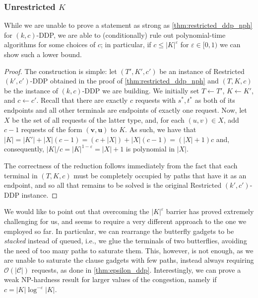 \documentclass[a4paper,UKenglish,cleveref, autoref, thm-restate]{lipics-v2021}
\renewcommand{\NP}{{\sf NP}\xspace}
\newcommand{\pname}[1]{{\sc #1}}
\newcommand{\bigO}[1]{\mathcal{O}\!\left(#1\right)}
\newcommand{\congestion}{c}
\begin{document}
  \subsubsection{Unrestricted $K$}

  While we are unable to prove a statement as strong as
  \autoref{thm:restricted_ddp_nph} for \pname{$(k,c)$-DDP}, we
  are able to (conditionally) rule out polynomial-time algorithms for some choices of $\congestion$;
  in particular, if $\congestion \leq |K|^\varepsilon$ for $\varepsilon \in [0,1)$ we can show
  such a lower bound.

  \epsilonddp*

  \begin{proof}
    The construction is simple: let $(T', K', \congestion')$ be an instance of \pname{Restricted $(k',c')$-DDP} obtained in the proof of
    \autoref{thm:restricted_ddp_nph} and $(T, K, \congestion)$ be the instance of
    \pname{$(k,c)$-DDP} we are building.
    We initially set $T \gets T'$, $K \gets K'$, and $\congestion \gets \congestion'$.
    Recall that there are exactly $\congestion$ requests with $s^*, t^*$ as both of its
    endpoints and all other terminals are endpoints of exactly one request.
    Now, let $X$ be the set of all requests of the latter type, and, for each $(u,v) \in
    X$, add $\congestion - 1$ requests of the form $(\bm{v,u})$ to $K$.
    As such, we have that $|K| = |K'| + |X|(\congestion-1) = (\congestion + |X|) +
    |X|(\congestion-1) = (|X| + 1)\congestion$ and, consequently, $|K|/\congestion =
    |K|^{1-\varepsilon} = |X| + 1$ is polynomial in $|X|$.

    The correctness of the reduction follows immediately from the fact that each terminal
    in $(T, K, \congestion)$ must be completely occupied by paths that have it as an
    endpoint, and
    so all that remains to be solved is the original \pname{Restricted $(k', c')$-DDP} instance.
  \end{proof}

  We would like to point out that overcoming the $|K|^\varepsilon$ barrier has proved extremely
  challenging for us, and seems to require a very different approach to the one we employed so far.
  In particular, we can rearrange the butterfly gadgets to be \textit{stacked}
  instead of queued, i.e., we glue the terminals of two butterflies, avoiding the need of
  too many paths to saturate them. This, however, is not enough, as we are unable to
  saturate the clause gadgets with few paths, instead always requiring
  $\bigO{|\mathcal{C}|}$ requests, as done in \autoref{thm:epsilon_ddp}.
  Interestingly, we can prove a weak \NP-hardness result for larger values of the
  congestion, namely if $\congestion = |K|\log^{-\varepsilon} |K|$.
\end{document}
